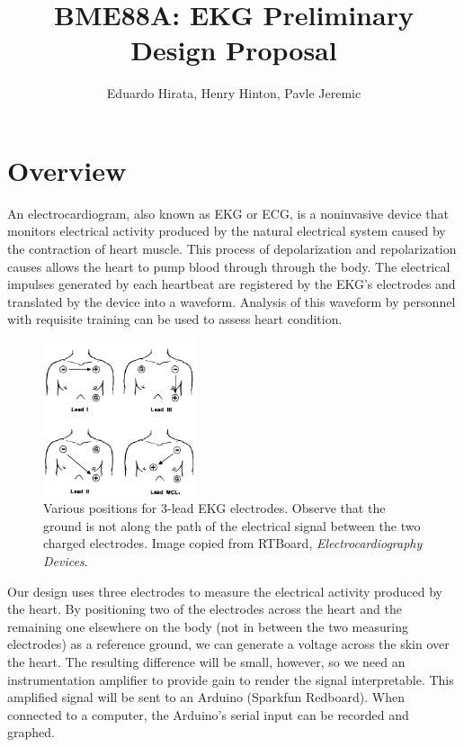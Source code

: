 \documentclass[11pt, oneside]{article}   	%
\title{BME88A: EKG Preliminary Design Proposal}
\author{Eduardo Hirata, Henry Hinton, Pavle Jeremic}
\begin{document}
\maketitle
\section{Overview}
	
	\onehalfspace

\par An electrocardiogram, also known as EKG or ECG, is a noninvasive device that monitors electrical activity produced by the natural electrical system caused by the contraction of heart muscle. This process of depolarization and repolarization causes allows the heart to pump blood through through the body. The electrical impulses generated by each heartbeat are registered by the EKG's electrodes and translated by the device into a waveform. Analysis of this waveform by personnel with requisite training can be used to assess heart condition.
 

\begin{figure}
	\includegraphics[width=0.4\textwidth]{ecg}
	\caption{Various positions for 3-lead EKG electrodes. Observe that the ground is not along the path of the electrical signal between the two charged electrodes. \cite{ecgpos} Image copied from RTBoard, \textit{Electrocardiography Devices}.}
\end{figure}

\par Our design uses three electrodes to measure the electrical activity produced by the heart. By positioning two of the electrodes across the heart and the remaining one elsewhere on the body (not in between the two measuring electrodes) as a reference ground, we can generate a voltage across the skin over the heart. The resulting difference will be small, however, so we need an instrumentation amplifier to provide gain to render the signal interpretable. This amplified signal will be sent to an Arduino (Sparkfun Redboard). When connected to a computer, the Arduino's serial input can be recorded and graphed.
\end{document}
